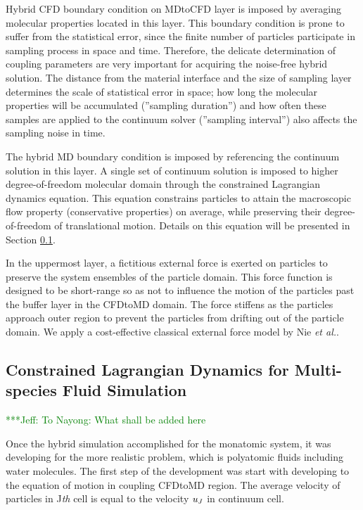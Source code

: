 \documentclass[]{aiaa-tc}%
\newcommand{\skonote}[1]{ {\textcolor{green} { ***Jeff: #1 }}}
\begin{document}
Hybrid CFD boundary condition on MDtoCFD layer is imposed by averaging
molecular properties located in this layer. This boundary condition is prone to
suffer from the statistical error\cite{Hadjicon3,Time_Mechanism}, since
the finite number of particles participate in sampling process in space and time.
Therefore, the delicate determination of coupling parameters are very important
for acquiring the noise-free hybrid solution. The distance from the material 
interface and the size of sampling layer determines the scale of statistical 
error in space; how long the molecular properties will be accumulated
(''sampling duration'') and how often these samples are applied to the 
continuum solver (''sampling interval'') also affects the sampling noise in time.

The hybrid MD boundary condition is imposed by referencing the continuum solution
in this layer. A single set of continuum solution is imposed to higher
degree-of-freedom molecular domain through the constrained Lagrangian dynamics
equation. This equation constrains particles to attain the macroscopic flow property 
(conservative properties) on average, while preserving their degree-of-freedom of 
translational motion. Details on this equation will be presented in Section
\ref{sec:hybrid_multispecies}.

In the uppermost layer, a fictitious external force is exerted on particles 
to preserve the system ensembles of the particle domain. This force function
is designed to be short-range so as not to influence the motion of the particles 
past the buffer layer in the CFDtoMD domain. The force stiffens as the particles 
approach outer region to prevent the particles from drifting out of the 
particle domain. We apply a cost-effective classical external force model 
by Nie {\it{et al.}}\cite{Nie}. 


\subsection{Constrained Lagrangian Dynamics for Multi-species Fluid Simulation}
\label{sec:hybrid_multispecies}

\skonote{To Nayong: What shall be added here}

Once the hybrid simulation accomplished for the monatomic system, it was developing for the more realistic problem, which is polyatomic fluids including water molecules.  The first step of the development was start with developing to the equation of motion in coupling CFDtoMD region. The average velocity of particles in J{\it{th}} cell is equal to the velocity $\it u_J$ in continuum cell.
\end{document}
